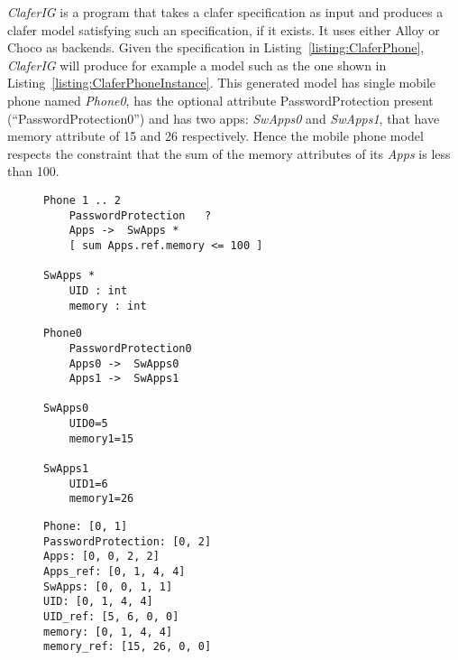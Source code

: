\documentclass{article}
\newcommand{\listref}[1]{Listing~\ref{#1}}
\begin{document}
\emph{ClaferIG}  is a program that takes a clafer specification as input and produces a clafer model satisfying such an specification, if it exists. It uses either Alloy or Choco as backends. Given the specification in  \listref{listing:ClaferPhone}, \emph{ClaferIG}   will produce for example a model such as the one shown in \listref{listing:ClaferPhoneInstance}.  This generated model has single mobile phone named \textit{Phone0}, has the optional attribute PasswordProtection present (``PasswordProtection0'') and has two apps: \textit{SwApps0} and \textit{SwApps1}, that have memory attribute of 15 and 26 respectively. Hence the mobile phone model respects the constraint that the sum of the memory attributes of its \textit{Apps} is less than 100. 
\begin{figure}[!t]
\par\noindent
\begin{minipage}[t]{.32\textwidth}
\begin{lstlisting}[language=clafer, caption=A specification of a mobile phone and its apps in clafer., label={listing:ClaferPhone}]
Phone 1 .. 2
	PasswordProtection 	 ?
	Apps ->  SwApps *
	[ sum Apps.ref.memory <= 100 ]
	
SwApps * 
	UID : int
	memory : int
\end{lstlisting}%
\end{minipage}%
\hfill
\begin{minipage}[t]{.32\textwidth}
\begin{lstlisting}[language=clafer, caption=A generated model of a mobile phone and its apps in clafer from the specification in Listing 1., label={listing:ClaferPhoneInstance}]
Phone0
	PasswordProtection0
	Apps0 ->  SwApps0
	Apps1 ->  SwApps1
	
SwApps0 
	UID0=5
	memory1=15

SwApps1 
	UID1=6
	memory1=26
\end{lstlisting}%
\end{minipage}%
\hfill
\begin{minipage}[t]{.32\textwidth}
\begin{lstlisting}[language=clafer, caption=The integer variables associated with each clafer in Z3 and corresponding to Listing 2., label={listing:ClaferPhoneZ3}]
Phone: [0, 1]
PasswordProtection: [0, 2]
Apps: [0, 0, 2, 2]
Apps_ref: [0, 1, 4, 4]
SwApps: [0, 0, 1, 1]
UID: [0, 1, 4, 4]
UID_ref: [5, 6, 0, 0]
memory: [0, 1, 4, 4]
memory_ref: [15, 26, 0, 0]
\end{lstlisting}%
\end{minipage}%
\end{figure}
\end{document}
